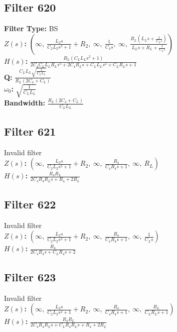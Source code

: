 \documentclass{article}
\begin{document}
\subsection*{Filter 620}
\textbf{Filter Type:} BS \\ 
\textbf{$Z(s)$:} $\left( \infty, \  \frac{L_{2} s}{C_{2} L_{2} s^{2} + 1} + R_{2}, \  \infty, \  \frac{1}{C_{4} s}, \  \infty, \  \frac{R_{L} \left(L_{L} s + \frac{1}{C_{L} s}\right)}{L_{L} s + R_{L} + \frac{1}{C_{L} s}}\right)$ \\ 
\textbf{$H(s)$:} $\frac{R_{L} \left(C_{L} L_{L} s^{2} + 1\right)}{2 C_{4} C_{L} L_{L} R_{L} s^{3} + 2 C_{4} R_{L} s + C_{L} L_{L} s^{2} + C_{L} R_{L} s + 1}$ \\ 
\textbf{Q:} $\frac{C_{L} L_{L} \sqrt{\frac{1}{C_{L} L_{L}}}}{R_{L} \left(2 C_{4} + C_{L}\right)}$ \\ 
\textbf{$\omega_0$:} $\sqrt{\frac{1}{C_{L} L_{L}}}$ \\ 
\textbf{Bandwidth:} $\frac{R_{L} \left(2 C_{4} + C_{L}\right)}{C_{L} L_{L}}$ \\ 
\subsection*{Filter 621}
Invalid filter \\ 
\textbf{$Z(s)$:} $\left( \infty, \  \frac{L_{2} s}{C_{2} L_{2} s^{2} + 1} + R_{2}, \  \infty, \  \frac{R_{4}}{C_{4} R_{4} s + 1}, \  \infty, \  R_{L}\right)$ \\ 
\textbf{$H(s)$:} $\frac{R_{4} R_{L}}{2 C_{4} R_{4} R_{L} s + R_{4} + 2 R_{L}}$ \\ 
\subsection*{Filter 622}
Invalid filter \\ 
\textbf{$Z(s)$:} $\left( \infty, \  \frac{L_{2} s}{C_{2} L_{2} s^{2} + 1} + R_{2}, \  \infty, \  \frac{R_{4}}{C_{4} R_{4} s + 1}, \  \infty, \  \frac{1}{C_{L} s}\right)$ \\ 
\textbf{$H(s)$:} $\frac{R_{4}}{2 C_{4} R_{4} s + C_{L} R_{4} s + 2}$ \\ 
\subsection*{Filter 623}
Invalid filter \\ 
\textbf{$Z(s)$:} $\left( \infty, \  \frac{L_{2} s}{C_{2} L_{2} s^{2} + 1} + R_{2}, \  \infty, \  \frac{R_{4}}{C_{4} R_{4} s + 1}, \  \infty, \  \frac{R_{L}}{C_{L} R_{L} s + 1}\right)$ \\ 
\textbf{$H(s)$:} $\frac{R_{4} R_{L}}{2 C_{4} R_{4} R_{L} s + C_{L} R_{4} R_{L} s + R_{4} + 2 R_{L}}$ \\ 
\end{document}
